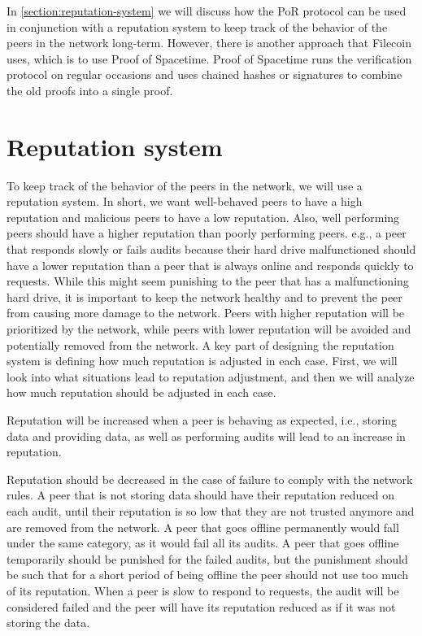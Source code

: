 In \autoref{section:reputation-system} we will discuss how the PoR protocol can be used in conjunction with
a reputation system to keep track of the behavior of the peers in the network long-term.
However, there is another approach that Filecoin \cite{filecoin} uses, which is to use 
Proof of Spacetime.
Proof of Spacetime runs the verification protocol on regular occasions and uses chained hashes or signatures
to combine the old proofs into a single proof.

\section{Reputation system}
\label{section:reputation-system}

To keep track of the behavior of the peers in the network, we will use a reputation system.
In short, we want well-behaved peers to have a high reputation and malicious peers to have a low reputation.
Also, well performing peers should have a higher reputation than poorly performing peers.
e.g., a peer that responds slowly or fails audits because their hard drive malfunctioned should
have a lower reputation than a peer that is always online and responds quickly to requests.
While this might seem punishing to the peer that has a malfunctioning hard drive,
it is important to keep the network healthy and to prevent the peer from causing more damage to the network.
Peers with higher reputation will be prioritized by the network, while peers with lower reputation will be
avoided and potentially removed from the network.
A key part of designing the reputation system is defining how much reputation is adjusted in each case.
First, we will look into what situations lead to reputation adjustment, and then we will
analyze how much reputation should be adjusted in each case.

Reputation will be increased when a peer is behaving as expected,
i.e., storing data and providing data, as well as performing audits will lead to an increase in reputation.

Reputation should be decreased in the case of failure to comply with the network rules.
A peer that is not storing data should have their reputation reduced on each audit,
until their reputation is so low that they are not trusted anymore and are removed from the network.
A peer that goes offline permanently would fall under the same category, as it would fail all its audits.
A peer that goes offline temporarily should be punished for the failed audits,
but the punishment should be such that for a short period of being offline the peer should not use 
too much of its reputation.
When a peer is slow to respond to requests, the audit will be considered failed and the peer will have
its reputation reduced as if it was not storing the data.

